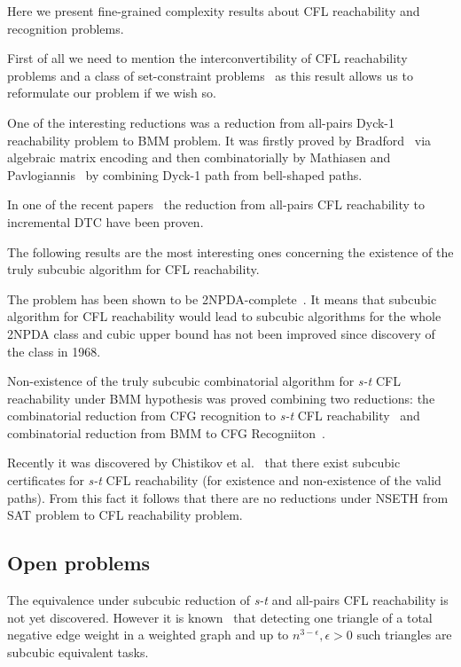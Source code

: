 \documentclass[acmsmall,review,nonacm]{acmart}\settopmatter{printfolios=true,printccs=false,printacmref=false}
\begin{document}
	Here we present fine-grained complexity results about CFL reachability and recognition problems.
	
	First of all we need to mention the interconvertibility of CFL reachability problems and a class of set-constraint problems~\cite{10.1145/258993.259006} as this result allows us to reformulate our problem if we wish so.
	
	One of the interesting reductions was a reduction from  all-pairs Dyck-1 reachability problem to BMM problem. It was firstly proved by Bradford~\cite{bradford2017efficient} via algebraic matrix encoding and then combinatorially by Mathiasen and Pavlogiannis~\cite{10.1145/3434315} by combining Dyck-1 path from bell-shaped paths.
		
	In one of the recent papers~\cite{inbook} the reduction from all-pairs CFL reachability to incremental DTC have been proven.
	
	The following results are the most interesting ones concerning the existence of  the truly subcubic algorithm for CFL reachability.
	
	The problem has been shown to be 2NPDA-complete~\cite{10.5555/788019.788876}. It means that subcubic algorithm for CFL reachability would lead to subcubic algorithms for the whole 2NPDA class and cubic upper bound has not been improved since discovery of the class in 1968.
	
	Non-existence of the truly subcubic combinatorial algorithm for \emph{s-t} CFL reachability under BMM hypothesis was proved combining two reductions: the combinatorial reduction from CFG recognition to \emph{s-t} CFL reachability~\cite{10.1145/3158118} and combinatorial reduction from BMM to CFG Recogniiton~\cite{10.1145/505241.505242}.
	
	Recently it was discovered by Chistikov et al.~\cite{chistikov2021subcubic} that there exist subcubic certificates for \emph{s-t} CFL reachability (for existence and non-existence of the valid paths). From this fact it follows that there are no reductions under NSETH from SAT problem to CFL reachability problem.

	\subsection{Open problems}
	
	The equivalence under subcubic reduction of \emph{s-t} and 
	all-pairs CFL reachability is not yet discovered. However it is known~\cite{10.1145/3186893} that detecting one triangle of a total negative edge weight in a weighted graph and up to $n^{3 - \epsilon}, \epsilon > 0$ such triangles are subcubic equivalent tasks. 
	
\end{document}
